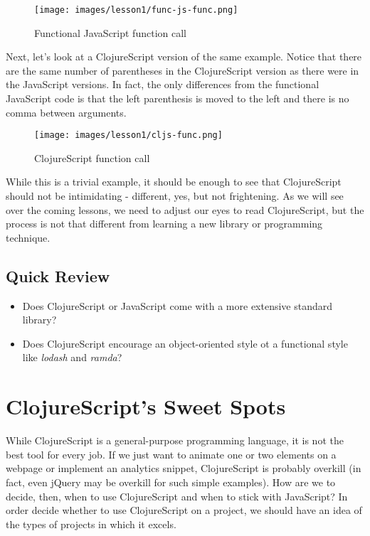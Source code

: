 \documentclass[10pt,twoside,openright]{memoir}
\begin{document}
\begin{figure}[H]
\caption{Functional JavaScript function call}
\centering
\texttt{[image: images/lesson1/func-js-func.png]}
\end{figure}

Next, let's look at a ClojureScript version of the same example. Notice
that there are the same number of parentheses in the ClojureScript
version as there were in the JavaScript versions. In fact, the only
differences from the functional JavaScript code is that the left
parenthesis is moved to the left and there is no comma between
arguments.

\begin{figure}[H]
\caption{ClojureScript function call}
\centering
\texttt{[image: images/lesson1/cljs-func.png]}
\end{figure}

While this is a trivial example, it should be enough to see that
ClojureScript should not be intimidating - different, yes, but not
frightening. As we will see over the coming lessons, we need to adjust
our eyes to read ClojureScript, but the process is not that different
from learning a new library or programming technique.

\subsection{Quick Review}

\begin{itemize}
\tightlist
\item
  Does ClojureScript or JavaScript come with a more extensive standard
  library?
\item
  Does ClojureScript encourage an object-oriented style ot a functional
  style like \emph{lodash} and \emph{ramda}?
\end{itemize}

\section{ClojureScript's Sweet Spots}

While ClojureScript is a general-purpose programming language, it is not
the best tool for every job. If we just want to animate one or two
elements on a webpage or implement an analytics snippet, ClojureScript
is probably overkill (in fact, even jQuery may be overkill for such
simple examples). How are we to decide, then, when to use ClojureScript
and when to stick with JavaScript? In order decide whether to use
ClojureScript on a project, we should have an idea of the types of
projects in which it excels.
\end{document}
